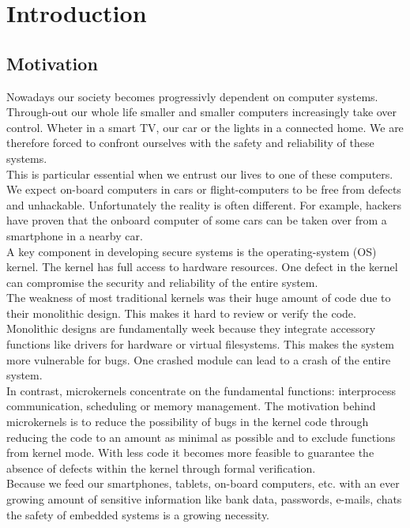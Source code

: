 \chapter{Introduction}
	\section{Motivation}
Nowadays our society becomes progressivly dependent on computer systems. Through-out our whole life smaller and smaller computers increasingly take over control. Wheter in a smart TV, our car or the lights in a connected home. We are therefore forced to confront ourselves with the safety and reliability of these systems. \\
This is particular essential when we entrust our lives to one of these computers. We expect on-board computers in cars or flight-computers to be free from defects and unhackable. Unfortunately the reality is often different. For example, hackers have proven that the onboard computer of some cars can be taken over from a smartphone in a nearby car. \\
A key component in developing secure systems is the operating-system (OS) kernel. The kernel has full access to hardware resources. One defect in the kernel can compromise the security and reliability of the entire system. \\
The weakness of most traditional kernels was their huge amount of code due to their monolithic design. This makes it hard to review or verify the code. Monolithic designs are fundamentally week because they integrate accessory functions like drivers for hardware or virtual filesystems. This makes the system more vulnerable for bugs. One crashed module can lead to a crash of the entire system. \\
In contrast, microkernels concentrate on the fundamental functions: interprocess communication, scheduling or memory management. The motivation behind microkernels is to reduce the  possibility of bugs in the kernel code through reducing the code to an amount as minimal as possible and to exclude functions from kernel mode. With less code it becomes more feasible to guarantee the absence of defects within the kernel through formal verification.\\
Because we feed our smartphones, tablets, on-board computers, etc. with an ever growing amount of sensitive information like bank data, passwords, e-mails, chats the safety of embedded systems is a growing necessity. \\
